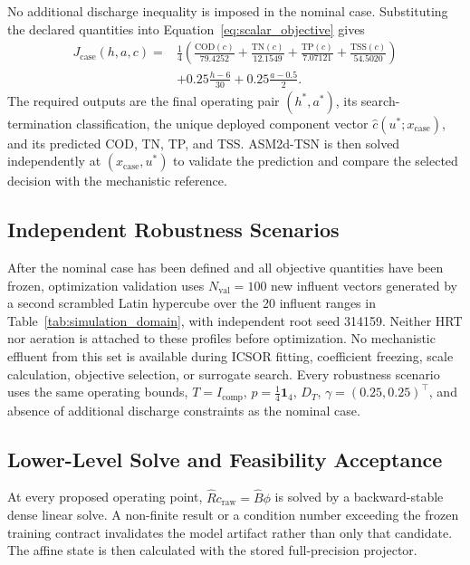 \documentclass[a4paper,fleqn]{cas-sc}
\begin{document}
No additional discharge inequality is imposed in the nominal case. Substituting the declared quantities into Equation~\eqref{eq:scalar_objective} gives
\begin{equation}
\label{eq:case_objective}
\begin{split}
J_{\mathrm{case}}(h,a,c)={}&
\frac14\left(
\frac{\mathrm{COD}(c)}{79.4252}
+\frac{\mathrm{TN}(c)}{12.1549}
+\frac{\mathrm{TP}(c)}{7.07121}
+\frac{\mathrm{TSS}(c)}{54.5020}
\right)\\
&+0.25\frac{h-6}{30}
+0.25\frac{a-0.5}{2}.
\end{split}
\end{equation}
The required outputs are the final operating pair $(h^*,a^*)$, its search-termination classification, the unique deployed component vector $\widehat c(u^*;x_{\mathrm{case}})$, and its predicted COD, TN, TP, and TSS. ASM2d-TSN is then solved independently at $(x_{\mathrm{case}},u^*)$ to validate the prediction and compare the selected decision with the mechanistic reference.

\subsection{Independent Robustness Scenarios}

After the nominal case has been defined and all objective quantities have been frozen, optimization validation uses $N_{\mathrm{val}}=100$ new influent vectors generated by a second scrambled Latin hypercube over the 20 influent ranges in Table~\ref{tab:simulation_domain}, with independent root seed 314159. Neither HRT nor aeration is attached to these profiles before optimization. No mechanistic effluent from this set is available during ICSOR fitting, coefficient freezing, scale calculation, objective selection, or surrogate search. Every robustness scenario uses the same operating bounds, $T=I_{\mathrm{comp}}$, $p=\tfrac14\mathbf1_4$, $D_T$, $\gamma=(0.25,0.25)^\top$, and absence of additional discharge constraints as the nominal case.

\subsection{Lower-Level Solve and Feasibility Acceptance}

At every proposed operating point, $\widehat R c_{\mathrm{raw}}=\widehat B\phi$ is solved by a backward-stable dense linear solve. A non-finite result or a condition number exceeding the frozen training contract invalidates the model artifact rather than only that candidate. The affine state is then calculated with the stored full-precision projector.
\end{document}
